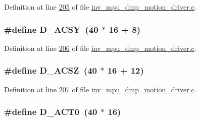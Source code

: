 Definition at line \hyperlink{inv__mpu__dmp__motion__driver_8c_source_l00205}{205} of file \hyperlink{inv__mpu__dmp__motion__driver_8c_source}{inv\+\_\+mpu\+\_\+dmp\+\_\+motion\+\_\+driver.\+c}.

\subsubsection[{\texorpdfstring{D\+\_\+\+A\+C\+SY}{D_ACSY}}]{\setlength{\rightskip}{0pt plus 5cm}\#define D\+\_\+\+A\+C\+SY~(40 $\ast$ 16 + 8)}\hypertarget{group___d_r_i_v_e_r_s_ga289d47aab7f881d4e0c1233229462644}{}\label{group___d_r_i_v_e_r_s_ga289d47aab7f881d4e0c1233229462644}


Definition at line \hyperlink{inv__mpu__dmp__motion__driver_8c_source_l00206}{206} of file \hyperlink{inv__mpu__dmp__motion__driver_8c_source}{inv\+\_\+mpu\+\_\+dmp\+\_\+motion\+\_\+driver.\+c}.

\subsubsection[{\texorpdfstring{D\+\_\+\+A\+C\+SZ}{D_ACSZ}}]{\setlength{\rightskip}{0pt plus 5cm}\#define D\+\_\+\+A\+C\+SZ~(40 $\ast$ 16 + 12)}\hypertarget{group___d_r_i_v_e_r_s_gaae2baed3a317cde49f3ab8af10e73e97}{}\label{group___d_r_i_v_e_r_s_gaae2baed3a317cde49f3ab8af10e73e97}


Definition at line \hyperlink{inv__mpu__dmp__motion__driver_8c_source_l00207}{207} of file \hyperlink{inv__mpu__dmp__motion__driver_8c_source}{inv\+\_\+mpu\+\_\+dmp\+\_\+motion\+\_\+driver.\+c}.

\subsubsection[{\texorpdfstring{D\+\_\+\+A\+C\+T0}{D_ACT0}}]{\setlength{\rightskip}{0pt plus 5cm}\#define D\+\_\+\+A\+C\+T0~(40 $\ast$ 16)}\hypertarget{group___d_r_i_v_e_r_s_ga5d68a8e4a168cc789fb481ba9b1ac431}{}\label{group___d_r_i_v_e_r_s_ga5d68a8e4a168cc789fb481ba9b1ac431}


